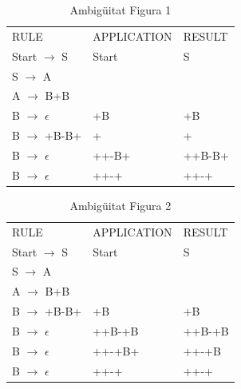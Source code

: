 \documentclass[12pt,a4paper]{report}
\begin{document}
\begin{table}[ht]
\caption{\label{tab:table-name} Ambigüitat Figura 1}
\centering
\begin{tabular}{lll}
\hline
\hline
RULE                       & APPLICATION                        & RESULT \\
Start $\rightarrow$ S      & Start                              & S      \\
S $\rightarrow$ A          & \color{Blue}{S} & \color{Blue}{A}      \\
A $\rightarrow$ B+B        & \color{Blue}{A}                                  & \color{Blue}{B+B}    \\
B $\rightarrow$ $\epsilon$ & \color{Blue}{B}+B                                & +B     \\
B $\rightarrow$ +B-B+      & +\color{Blue}{B}                                 & +\color{Blue}{+B-B+} \\
B $\rightarrow$ $\epsilon$ & ++\color{Blue}{B}-B+                             & ++B-B+ \\
B $\rightarrow$ $\epsilon$ & ++-\color{Blue}{B}+                              & ++-+  \\ \hline
\end{tabular}
\end{table}

\begin{table}[ht]
\caption{\label{tab:table-name} Ambigüitat Figura 2}
\centering
\begin{tabular}{lll}
\hline
\hline
RULE                       & APPLICATION                        & RESULT  \\
Start $\rightarrow$ S      & Start                              & S       \\
S $\rightarrow$ A          & \color{Blue}{S} & \color{Blue}{A}       \\
A $\rightarrow$ B+B        & \color{Blue}{A}                                  & \color{Blue}{B+B}     \\
B $\rightarrow$ +B-B+      & \color{Blue}{B}+B                                & \color{Blue}{+B+B-}+B \\
B $\rightarrow$ $\epsilon$ & +\color{Blue}{B}+B-+B                            & ++B-+B  \\
B $\rightarrow$ $\epsilon$ & ++\color{Blue}{B}-+B+                            & ++-+B   \\
B $\rightarrow$ $\epsilon$ & ++-+\color{Blue}{B}                              & ++-+   
\end{tabular}
\end{table}
\end{document}
